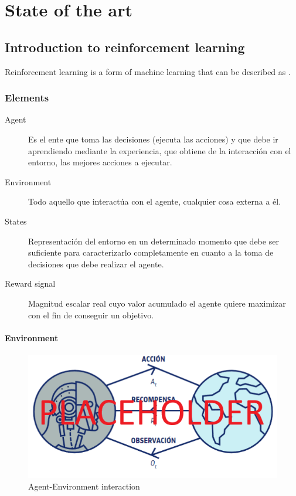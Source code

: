 \chapter{State of the art}
\label{chapter:state_of_the_art}

\section{Introduction to reinforcement learning}

Reinforcement learning is a form of machine learning that can be described as  \cite{Kaelbling:1996}.

\subsection{Elements}

\begin{description}
    \item[Agent] Es el ente que toma las decisiones (ejecuta las acciones) y que debe ir aprendiendo mediante la experiencia, que obtiene de la interacción con el entorno, las mejores acciones a ejecutar.
    \item[Environment] Todo aquello que interactúa con el agente, cualquier cosa externa a él.
    \item[States] Representación del entorno en un determinado momento que debe ser suficiente para caracterizarlo completamente en cuanto a la toma de decisiones que debe realizar el agente.
    \item[Reward signal] Magnitud escalar real cuyo valor acumulado el agente quiere maximizar con el fin de conseguir un objetivo.
\end{description}

\subsubsection{Environment}

\begin{figure}[!h]
    \label{fig:interaction}
    \centering
    \includegraphics[width=.8\textwidth]{figs/RL_schema.png}
    \caption{Agent-Environment interaction}
\end{figure}

